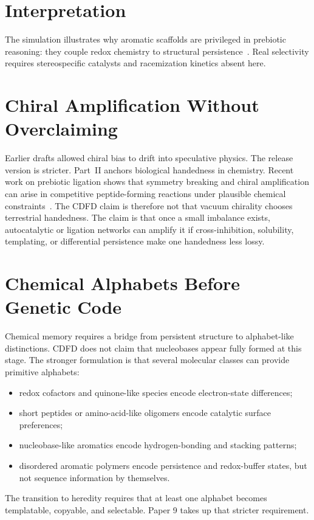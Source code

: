 \documentclass[11pt,a4paper]{article}
\begin{document}
\section{Interpretation}
The simulation illustrates why aromatic scaffolds are privileged in prebiotic reasoning: they couple redox chemistry to structural persistence~\cite{Cleaves2008}. Real selectivity requires stereospecific catalysts and racemization kinetics absent here.

\section{Chiral Amplification Without Overclaiming}
Earlier drafts allowed chiral bias to drift into speculative physics. The release version is stricter. Part~II anchors biological handedness in chemistry. Recent work on prebiotic ligation shows that symmetry breaking and chiral amplification can arise in competitive peptide-forming reactions under plausible chemical constraints~\cite{Deng2024}. The CDFD claim is therefore not that vacuum chirality chooses terrestrial handedness. The claim is that once a small imbalance exists, autocatalytic or ligation networks can amplify it if cross-inhibition, solubility, templating, or differential persistence make one handedness less lossy.

\section{Chemical Alphabets Before Genetic Code}
Chemical memory requires a bridge from persistent structure to alphabet-like distinctions. CDFD does not claim that nucleobases appear fully formed at this stage. The stronger formulation is that several molecular classes can provide primitive alphabets:
\begin{itemize}
\item redox cofactors and quinone-like species encode electron-state differences;
\item short peptides or amino-acid-like oligomers encode catalytic surface preferences;
\item nucleobase-like aromatics encode hydrogen-bonding and stacking patterns;
\item disordered aromatic polymers encode persistence and redox-buffer states, but not sequence information by themselves.
\end{itemize}
The transition to heredity requires that at least one alphabet becomes templatable, copyable, and selectable. Paper 9 takes up that stricter requirement.
\end{document}
